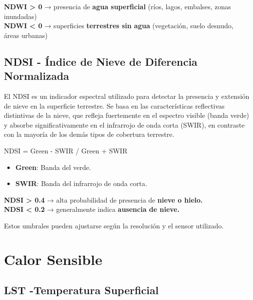 \documentclass[
]{book}
\providecommand{\tightlist}{%
  \setlength{\itemsep}{0pt}\setlength{\parskip}{0pt}}
\begin{document}
\textbf{NDWI \textgreater{} 0} → presencia de \textbf{agua superficial} (ríos, lagos, embalses, zonas inundadas)\\
\textbf{NDWI \textless{} 0} → superficies \textbf{terrestres sin agua} (vegetación, suelo desnudo, áreas urbanas)

\subsection{\texorpdfstring{\textbf{NDSI} - Índice de Nieve de Diferencia Normalizada}{NDSI - Índice de Nieve de Diferencia Normalizada}}\label{ndsi---uxedndice-de-nieve-de-diferencia-normalizada}

El NDSI es un indicador espectral utilizado para detectar la presencia y extensión de nieve en la superficie terrestre. Se basa en las características reflectivas distintivas de la nieve, que refleja fuertemente en el espectro visible (banda verde) y absorbe significativamente en el infrarrojo de onda corta (SWIR), en contraste con la mayoría de los demás tipos de cobertura terrestre.

NDSI = Green - SWIR / Green + SWIR\hspace{0pt}

\begin{itemize}
\tightlist
\item
  \textbf{Green}: Banda del verde.\\
\item
  \textbf{SWIR}: Banda del infrarrojo de onda corta.
\end{itemize}

\textbf{NDSI \textgreater{} 0.4} → alta probabilidad de presencia de \textbf{nieve o hielo.}\\
\textbf{NDSI \textless{} 0.2} → generalmente indica \textbf{ausencia de nieve.}

Estos umbrales pueden ajustarse según la resolución y el sensor utilizado.

\section{\texorpdfstring{\textbf{Calor Sensible}}{Calor Sensible}}\label{calor-sensible}

\subsection{\texorpdfstring{\textbf{LST} -Temperatura Superficial}{LST -Temperatura Superficial}}\label{lst--temperatura-superficial}
\end{document}
